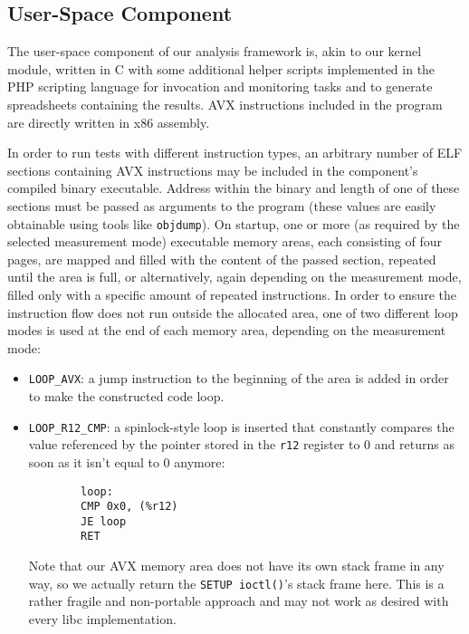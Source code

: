 \subsection{User-Space Component}
\label{sec:analysis:design:userspace}

The user-space component of our analysis framework is, akin to our kernel module, written in C with some additional helper scripts implemented in the PHP scripting language for invocation and monitoring tasks and to generate spreadsheets containing the results. \gls{AVX} instructions included in the program are directly written in x86 assembly.

In order to run tests with different instruction types, an arbitrary number of \gls{ELF} sections containing \gls{AVX} instructions may be included in the component's compiled binary executable. Address within the binary and length of one of these sections must be passed as arguments to the program (these values are easily obtainable using tools like \texttt{objdump}). On startup, one or more (as required by the selected measurement mode) executable memory areas, each consisting of four pages, are mapped and filled with the content of the passed section, repeated until the area is full, or alternatively, again depending on the measurement mode, filled only with a specific amount of repeated instructions. In order to ensure the instruction flow does not run outside the allocated area, one of two different loop modes is used at the end of each memory area, depending on the measurement mode:

\begin{itemize}
	\item \texttt{LOOP\_AVX}: a jump instruction to the beginning of the area is added in order to make the constructed code loop.
	\item \texttt{LOOP\_R12\_CMP}: a spinlock-style loop is inserted that constantly compares the value referenced by the pointer stored in the \texttt{r12} register to $0$ and returns as soon as it isn't equal to $0$ anymore:
		\begin{verbatim}
		loop:
		CMP 0x0, (%r12)
		JE loop
		RET
		\end{verbatim}
		Note that our \gls{AVX} memory area does not have its own stack frame in any way, so we actually return the \texttt{SETUP ioctl()}'s stack frame here. This is a rather fragile and non-portable approach and may not work as desired with every \gls{libc} implementation.
\end{itemize}

